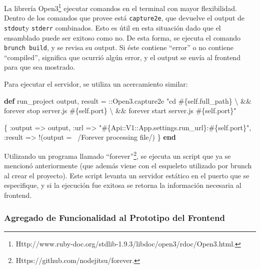 \documentclass[12pt,titlepage,]{article}
\newenvironment{Shaded}{}{}
\newcommand{\KeywordTok}[1]{\textcolor[rgb]{0.00,0.44,0.13}{\textbf{{#1}}}}
\newcommand{\DataTypeTok}[1]{\textcolor[rgb]{0.56,0.13,0.00}{{#1}}}
\newcommand{\DecValTok}[1]{\textcolor[rgb]{0.25,0.63,0.44}{{#1}}}
\newcommand{\StringTok}[1]{\textcolor[rgb]{0.25,0.44,0.63}{{#1}}}
\newcommand{\OtherTok}[1]{\textcolor[rgb]{0.00,0.44,0.13}{{#1}}}
\newcommand{\NormalTok}[1]{{#1}}
\begin{document}
La librería Open3\footnote{Http://www.ruby-doc.org/stdlib-1.9.3/libdoc/open3/rdoc/Open3.html.}
ejecutar comandos en el terminal con mayor flexibilidad. Dentro de los
comandos que provee está \texttt{capture2e}, que devuelve el output de
\texttt{stdout}y \texttt{stderr} combinados. Esto es útil en esta
situación dado que el ensamblado puede ser exitoso como no. De esta
forma, se ejecuta el comando \texttt{brunch build}, y se revisa su
output. Si éste contiene ``error'' o no contiene ``compiled'', significa
que ocurrió algún error, y el output se envía al frontend para que sea
mostrado.

Para ejecutar el servidor, se utiliza un acercamiento similar:

\begin{Shaded}
\begin{Highlighting}[]
\KeywordTok{def} \NormalTok{run_project}
  \NormalTok{output, result = ::}\DataTypeTok{Open3}\NormalTok{.capture2e }\StringTok{"cd }\OtherTok{#\{}\DecValTok{self}\NormalTok{.full_path}\OtherTok{\}}\StringTok{ \textbackslash{}}
\StringTok{                   && forever stop server.js }\OtherTok{#\{}\DecValTok{self}\NormalTok{.port}\OtherTok{\}}\StringTok{ \textbackslash{}}
\StringTok{                   && forever start server.js }\OtherTok{#\{}\DecValTok{self}\NormalTok{.port}\OtherTok{\}}\StringTok{"}

  \NormalTok{\{}
    \StringTok{:output} \NormalTok{=> output,}
    \StringTok{:url} \NormalTok{=> }\StringTok{"}\OtherTok{#\{}\DataTypeTok{Api}\NormalTok{::}\DataTypeTok{V1}\NormalTok{::}\DataTypeTok{App}\NormalTok{.settings.run_url}\OtherTok{\}}\StringTok{:}\OtherTok{#\{}\DecValTok{self}\NormalTok{.port}\OtherTok{\}}\StringTok{"}\NormalTok{,}
    \StringTok{:result} \NormalTok{=> !(output =~ }\OtherTok{/Forever processing file/}\NormalTok{)}
  \NormalTok{\}}
\KeywordTok{end}
\end{Highlighting}
\end{Shaded}

Utilizando un programa llamado ``forever''\footnote{Https://github.com/nodejitsu/forever.},
se ejecuta un script que ya se mencionó anteriormente (que además viene
con el esqueleto utilizado por brunch al crear el proyecto). Este script
levanta un servidor estático en el puerto que se especifique, y si la
ejecución fue exitosa se retorna la información necesaria al frontend.

\subsubsection{Agregado de Funcionalidad al Prototipo del Frontend}
\end{document}
